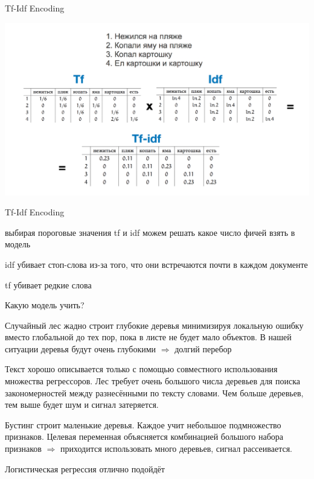 \documentclass[notes,12pt, aspectratio=169]{beamer}
\newenvironment{wideitemize}{\itemize\addtolength{\itemsep}{10pt}}{\enditemize}
\begin{document}
\begin{frame}{Tf-Idf Encoding}
	\begin{center}
		\includegraphics[width=.9\linewidth]{tf-idf.png}
	\end{center}
\end{frame} 


\begin{frame}{Tf-Idf Encoding}
	\begin{wideitemize} 
		\item  выбирая пороговые значения tf и idf можем решать какое число фичей взять в модель
		\item  idf убивает стоп-слова из-за того, что они встречаются почти в каждом документе
		\item  tf убивает редкие слова 
	\end{wideitemize}
\end{frame} 


\begin{frame}[shrink=10]{Какую модель учить?}
	
	\begin{wideitemize} 
		\item  Случайный лес жадно строит глубокие деревья минимизируя локальную ошибку вместо глобальной до тех пор, пока в листе не будет мало объектов. В нашей ситуации деревья будут очень глубокими $\Rightarrow$ \alert{долгий перебор}
		
		\item Текст хорошо описывается только с помощью совместного использования множества регрессоров. Лес требует очень большого числа деревьев для поиска закономерностей между разнесёнными по тексту словами. \alert{Чем больше деревьев, тем выше будет шум и сигнал затеряется.}
		
		\item Бустинг строит маленькие деревья. Каждое учит небольшое подмножество признаков. Целевая переменная объясняется комбинацией большого набора признаков  $\Rightarrow$ \alert{приходится использовать много деревьев, сигнал рассеивается.}
		
		\item  \alert{Логистическая регрессия отлично  подойдёт}
	\end{wideitemize}
\end{frame} 
\end{document}
